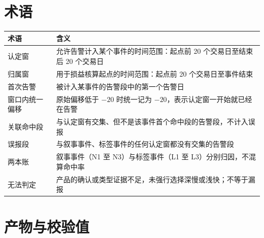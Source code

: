 \documentclass[12pt,a4paper]{ctexart}
\begin{document}
\appendix

\section{术语}

\begin{center}\small
\begin{tabularx}{\textwidth}{@{}>{\raggedright\arraybackslash}p{3.6cm}Y@{}}
\toprule
\textbf{术语} & \textbf{含义} \\
\midrule
认定窗 & 允许告警计入某个事件的时间范围：起点前 20 个交易日至结束后 20 个交易日 \\
归属窗 & 用于损益核算起点的时间范围：起点前 20 个交易日至事件结束 \\
首次告警 & 被计入某事件的告警段中的第一个告警日 \\
窗口内统一偏移 & 原始偏移低于 $-20$ 时统一记为 $-20$，表示认定窗一开始就已经在告警 \\
关联命中段 & 与认定窗有交集、但不是该事件首个命中段的告警段，不计入误报 \\
误报段 & 与叙事事件、标签事件的任何认定窗都没有交集的告警段 \\
两本账 & 叙事事件（N1 至 N3）与标签事件（L1 至 L3）分别归因，不混算命中率 \\
无法判定 & 产品的确认或类型证据不足，未强行选择深慢或浅快；不等于漏报 \\
\bottomrule
\end{tabularx}
\end{center}

\section{产物与校验值}
\end{document}
